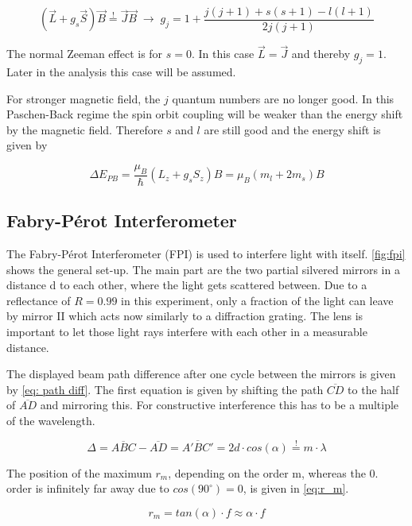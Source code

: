 \documentclass[]{article}
\begin{document}
\begin{equation}
(\vec{L}+g_s\vec{S})\vec{B}  \overset{!}{=}  \vec{J}\vec{B} \;\rightarrow\; g_j = 1+\frac{j(j+1)+s(s+1)-l(l+1)}{2j(j+1)}
\label{eq:get mj}
\end{equation}

The normal Zeeman effect is for $s=0$. In this case $\vec{L}=\vec{J}$ and thereby $g_j=1$. Later in the analysis this case will be assumed.

For stronger magnetic field, the $j$ quantum numbers are no longer good. In this Paschen-Back regime the spin orbit coupling will be weaker than the energy shift by the magnetic field. Therefore $s$ and $l$ are still good and the energy shift is given by 

\begin{equation}
\Delta E_{PB}= \frac{\mu_B}{\hbar} (L_z + g_sS_z)B=\mu_B (m_l + 2m_s)B
\label{eq:paschen back}
\end{equation}


\subsection{Fabry-Pérot Interferometer}
The Fabry-Pérot Interferometer (FPI) is used to interfere light with itself. \autoref{fig:fpi} shows the general set-up. The main part are the two partial silvered mirrors in a distance d to each other, where the light gets scattered between. Due to a reflectance of $R=0.99$ in this experiment, only a fraction of the light can leave by mirror II which acts now similarly to a diffraction grating. The lens is important to let those light rays interfere with each other in a measurable distance. 

The displayed beam path difference after one cycle between the mirrors is given by \autoref{eq: path diff}. The first equation is given by shifting the path $\overline{CD}$ to the half of $\overline{AD}$ and mirroring this. For constructive interference this has to be a multiple of the wavelength.

\begin{equation}
\Delta= \overline{ABC} - \overline{AD} = \overline{A'BC'} = 2d\cdot cos(\alpha) \overset{!}{=} m\cdot \lambda
\label{eq: path diff}
\end{equation}

The position of the maximum $r_m$, depending on the order m, whereas the 0. order is infinitely far away due to $cos(90^\circ)=0$, is given in \autoref{eq:r_m}.

\begin{equation}
r_m=tan(\alpha)\cdot f\approx \alpha\cdot f
\label{eq:r_m}
\end{equation}
\end{document}
